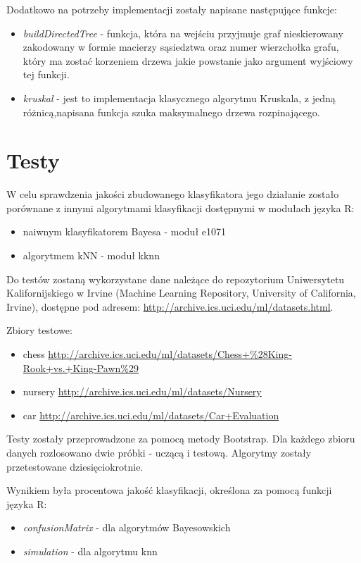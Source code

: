 \documentclass[paper=a4, fontsize=11pt]{scrartcl} %
\numberwithin{equation}{section} %
\numberwithin{figure}{section} %
\numberwithin{table}{section} %
\begin{document}
Dodatkowo na potrzeby implementacji zostały napisane następujące funkcje:
\begin{itemize}
 \item \textit{buildDirectedTree} - funkcja, która na wejściu przyjmuje graf nieskierowany zakodowany w formie macierzy sąsiedztwa oraz numer wierzchołka grafu, który ma zostać korzeniem drzewa jakie powstanie jako argument wyjściowy tej funkcji.
 \item \textit{kruskal} - jest to implementacja klasycznego algorytmu Kruskala, z jedną różnicą,napisana funkcja szuka maksymalnego drzewa rozpinającego.
\end{itemize}

\section{Testy}

W celu sprawdzenia jakości zbudowanego klasyfikatora jego działanie zostało porównane z innymi algorytmami klasyfikacji dostępnymi w modułach języka R: \\
\begin{itemize}
\item naiwnym klasyfikatorem Bayesa - moduł e1071
\item algorytmem kNN - moduł kknn 
\end{itemize}

Do testów zostaną wykorzystane dane należące do repozytorium Uniwersytetu Kalifornijskiego w Irvine (Machine Learning Repository, University of California, Irvine), dostępne pod adresem: \url{http://archive.ics.uci.edu/ml/datasets.html}.

Zbiory testowe:
\begin{itemize}
\item chess \url{http://archive.ics.uci.edu/ml/datasets/Chess+%28King-Rook+vs.+King-Pawn%29}
\item nursery \url{http://archive.ics.uci.edu/ml/datasets/Nursery}
\item car \url{http://archive.ics.uci.edu/ml/datasets/Car+Evaluation}
\end{itemize}

Testy zostały przeprowadzone za pomocą metody Bootstrap. Dla każdego zbioru danych rozlosowano dwie próbki - uczącą i testową. Algorytmy zostały przetestowane dziesięciokrotnie.

Wynikiem była procentowa jakość klasyfikacji, określona za pomocą funkcji języka R:
\begin{itemize}
\item \textit{confusionMatrix} - dla algorytmów Bayesowskich
\item \textit{simulation} - dla algorytmu knn
\end{itemize}
\end{document}
